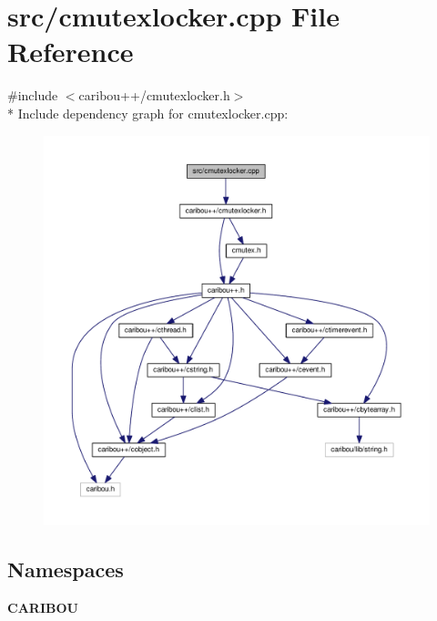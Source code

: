 \section{src/cmutexlocker.cpp File Reference}
\label{cmutexlocker_8cpp}
{\ttfamily \#include $<$caribou++/cmutexlocker.\+h$>$}\\*
Include dependency graph for cmutexlocker.\+cpp\+:
\nopagebreak
\begin{figure}[H]
\begin{center}
\leavevmode
\includegraphics[width=350pt]{cmutexlocker_8cpp__incl}
\end{center}
\end{figure}
\subsection*{Namespaces}
\begin{DoxyCompactItemize}
\item 
 {\bf C\+A\+R\+I\+B\+OU}
\end{DoxyCompactItemize}
